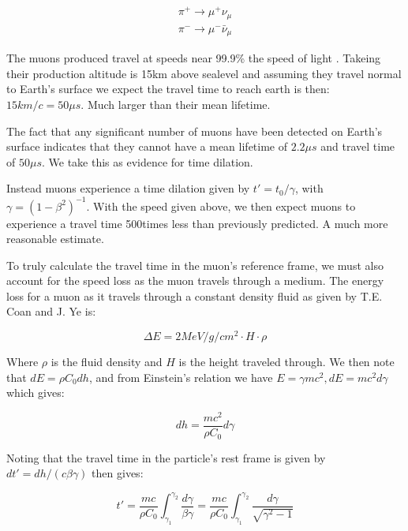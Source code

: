 \documentclass[12pt,twocolumn]{article}
\begin{document}
\begin{equation}
	\label{eq:PionDecay}
	\begin{array}{c}
	\pi^{+}\rightarrow\mu^{+}\nu_{\mu} \\
	\pi^{-}\rightarrow\mu^{-}\bar{\nu}_{\mu}
\end{array}
\end{equation}

The muons produced travel at speeds near 99.9\% the speed of light \cite{PDG}. Takeing their production
altitude is 15km above sealevel\cite{PDG} and assuming they travel normal to Earth's surface we expect
the travel time to reach earth is then: $15km/c = 50\mu s$. Much larger than their mean lifetime.

The fact that any significant number of muons have been detected on Earth's surface indicates that they
cannot have a mean lifetime of $2.2\mu s$ and travel time of $50\mu s$. We take this as evidence for time
dilation.

Instead muons experience a time dilation given by $t'=t_{0}/\gamma$, with $\gamma=\left(1-\beta^{2}\right)^{-1}$.
With the speed given above, we then expect muons to experience a travel time 500times less than previously
predicted. A much more reasonable estimate. 

To truly calculate the travel time in the muon's reference frame, we must also account for the
speed loss as the muon travels through a medium. The energy loss for a muon as it travels
through a constant density fluid as given by T.E. Coan and J. Ye\cite{MUON} is:

\begin{equation}
	\label{eq:decaytime}
	\Delta E = 2 MeV/g/cm^{2} \cdot H \cdot \rho
\end{equation}

Where $\rho$ is the fluid density and $H$ is the height traveled through. We then note that
$dE=\rho C_{0} dh$, and from Einstein's relation we have $E=\gamma mc^{2}, dE=mc^{2}d\gamma$
which gives:

\begin{equation}
	dh = \frac{mc^{2}}{\rho C_{0}} d\gamma
\end{equation}

Noting that the travel time in the particle's rest frame is given by $dt'=dh / \left( c\beta\gamma \right)$
then gives:

\begin{equation}
	t' = \frac{mc}{\rho C_{0}} \int_{\gamma_{1}}^{\gamma_{2}} \frac{ d\gamma }{ \beta\gamma } = \frac{mc}{\rho C_{0}} \int_{\gamma_{1}}^{\gamma_{2}} \frac{ d\gamma }{ \sqrt{ \gamma^{2}-1 } }
\end{equation}
\end{document}
